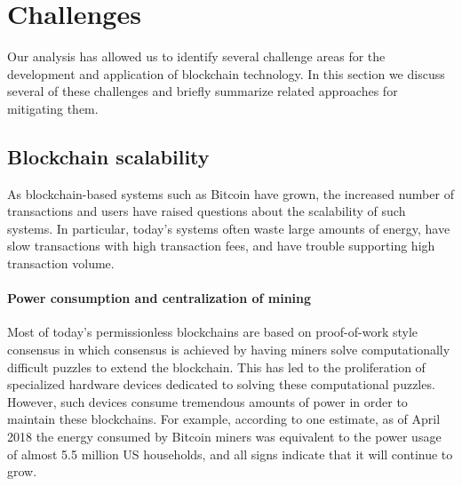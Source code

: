 
\section{Challenges}
\label{sec:challenges}


Our analysis has allowed us to identify several challenge areas for the development and application of blockchain technology.  In this section we discuss several of these challenges and briefly summarize related approaches for mitigating them.

\subsection{Blockchain scalability}
As blockchain-based systems such as Bitcoin have grown, the increased number of transactions and users have raised questions about the scalability of such systems.  In particular, today's systems often waste large amounts of energy, have slow transactions with high transaction fees, and have trouble supporting high transaction volume.

\paragraph{Power consumption and centralization of mining}
Most of today's permissionless blockchains are based on proof-of-work style consensus in which consensus is achieved by having miners solve computationally difficult puzzles to extend the blockchain.  This has led to the proliferation of specialized hardware devices dedicated to solving these computational puzzles.  However, such devices consume tremendous amounts of power in order to maintain these blockchains.  For example, according to one estimate\cite{Digiconomist}, as of April 2018 the energy consumed by Bitcoin miners was equivalent to the power usage of almost 5.5 million US households, and all signs indicate that it will continue to grow.

